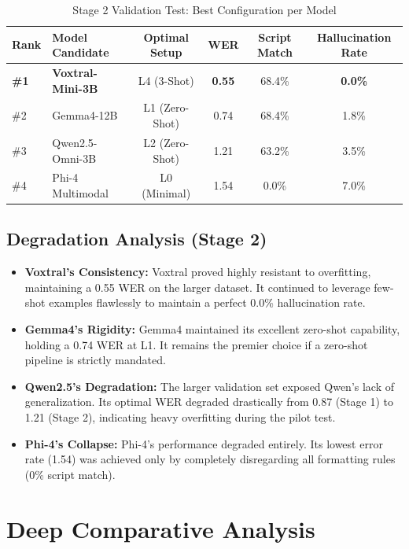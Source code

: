 \documentclass[12pt]{article}
\begin{document}
\begin{table}[H]
\centering
\caption{Stage 2 Validation Test: Best Configuration per Model}
\begin{tabularx}{\textwidth}{@{} l X c c c c @{}}
\toprule
\textbf{Rank} & \textbf{Model Candidate} & \textbf{Optimal Setup} & \textbf{WER} & \textbf{Script Match} & \textbf{Hallucination Rate} \\
\midrule
\textbf{\#1} & \textbf{Voxtral-Mini-3B} & L4 (3-Shot) & \textbf{0.55} & 68.4\% & \textbf{0.0\%} \\
\#2 & Gemma4-12B & L1 (Zero-Shot) & 0.74 & 68.4\% & 1.8\% \\
\#3 & Qwen2.5-Omni-3B & L2 (Zero-Shot) & 1.21 & 63.2\% & 3.5\% \\
\#4 & Phi-4 Multimodal & L0 (Minimal) & 1.54 & 0.0\% & 7.0\% \\
\bottomrule
\end{tabularx}
\end{table}

\subsection{Degradation Analysis (Stage 2)}
\begin{itemize}
    \item \textbf{Voxtral's Consistency:} Voxtral proved highly resistant to overfitting, maintaining a 0.55 WER on the larger dataset. It continued to leverage few-shot examples flawlessly to maintain a perfect 0.0\% hallucination rate.
    \item \textbf{Gemma4's Rigidity:} Gemma4 maintained its excellent zero-shot capability, holding a 0.74 WER at L1. It remains the premier choice if a zero-shot pipeline is strictly mandated.
    \item \textbf{Qwen2.5's Degradation:} The larger validation set exposed Qwen's lack of generalization. Its optimal WER degraded drastically from 0.87 (Stage 1) to 1.21 (Stage 2), indicating heavy overfitting during the pilot test.
    \item \textbf{Phi-4's Collapse:} Phi-4's performance degraded entirely. Its lowest error rate (1.54) was achieved only by completely disregarding all formatting rules (0\% script match). 
\end{itemize}

\section{Deep Comparative Analysis}
\end{document}
